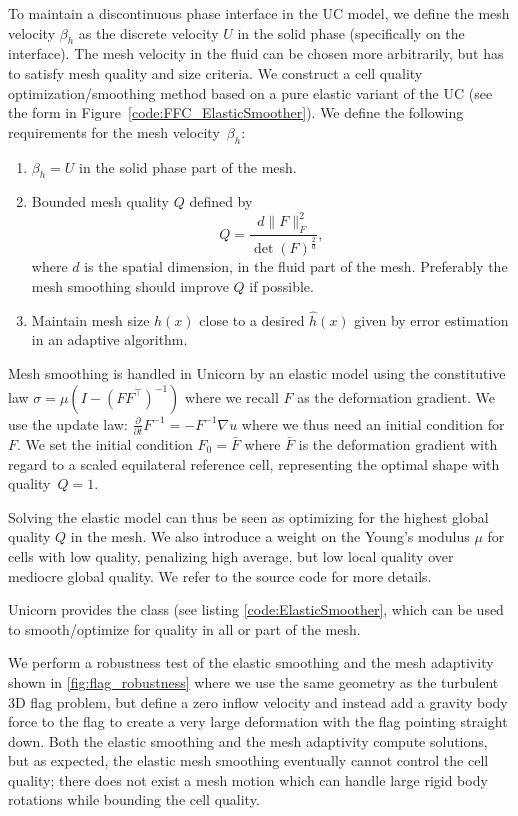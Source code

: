 To maintain a discontinuous phase interface in the UC model, we define
the mesh velocity $\beta_h$ as the discrete velocity $U$ in the solid
phase (specifically on the interface). The mesh velocity in the fluid
can be chosen more arbitrarily, but has to satisfy mesh quality and
size criteria. We construct a cell quality optimization/smoothing
method based on a pure elastic variant of the UC (see the form in
Figure~\ref{code:FFC_ElasticSmoother}). We define the following
requirements for the mesh velocity~$\beta_h$:\enlargethispage{12pt}
\begin{enumerate}
\item $\beta_h = U$ in the solid phase part of the mesh.
\item Bounded mesh quality $Q$ defined by $$Q = \frac{d \| F
  \|_F^2}{\det(F)^{\frac{2}{d}}},$$ where $d$ is the spatial dimension, in
  the fluid part of the mesh. Preferably the mesh smoothing should
  improve $Q$ if possible.
\item Maintain mesh size $h(x)$ close to a desired $\hat{h}(x)$ given
  by \apost{} error estimation in an adaptive algorithm.
\end{enumerate}
Mesh smoothing is handled in Unicorn by an elastic model using the
constitutive law $\sigma = \mu(I - (FF^\top)^{-1})$ where we recall
$F$ as the deformation gradient. We use the update law:
$\frac{\partial}{\partial t} F^{-1} = -F^{-1} \nabla u$ where we thus
need an initial condition for $F$. We set the initial condition $F_0 =
\bar{F}$ where $\bar{F}$ is the deformation gradient with regard to a
scaled equilateral reference cell, representing the optimal shape with
quality~$Q = 1$.

Solving the elastic model can thus be seen as optimizing for the
highest global quality $Q$ in the mesh. We also introduce a weight on
the Young's modulus $\mu$ for cells with low quality, penalizing high
average, but low local quality over mediocre global quality. We refer
to the source code for more details.

Unicorn provides the  class (see listing
\ref{code:ElasticSmoother}, which can be used to smooth/optimize for
quality in all or part of the mesh.

We perform a robustness test of the elastic smoothing and the mesh
adaptivity shown in \ref{fig:flag_robustness} where we use the same
geometry as the turbulent 3D flag problem, but define a zero inflow
velocity and instead add a gravity body force to the flag to create a
very large deformation with the flag pointing straight down. Both the
elastic smoothing and the mesh adaptivity compute solutions, but as
expected, the elastic mesh smoothing eventually cannot control the
cell quality; there does not exist a mesh motion which can handle
large rigid body rotations while bounding the cell quality.

